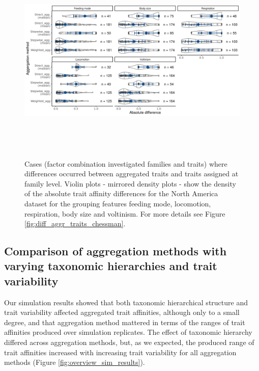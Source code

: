 \documentclass{article}
\begin{document}
\begin{figure}[H]
  \centering
  \includegraphics[width=16.5cm, height=10cm]{Deviances_trait_agg_pyne.png}
  \caption{Cases (factor combination investigated families and traits) where differences occurred between aggregated traits and traits assigned at family level. Violin plots - mirrored density plots - show the density of the absolute trait affinity differences for the North America dataset for the grouping features feeding mode, locomotion, respiration, body size and voltinism. For more details see Figure \ref{fig:diff_aggr_traits_chessman}.}
  \label{fig:diff_aggr_traits_pyne}
\end{figure}

\newpage 


\subsection*{Comparison of aggregation methods with varying taxonomic hierarchies and trait variability}

Our simulation results showed that both taxonomic hierarchical structure and trait variability affected aggregated trait affinities, although only to a small degree, and that aggregation method mattered in terms of the ranges of trait affinities produced over simulation replicates. The effect of taxonomic hierarchy differed across aggregation methods, but, as we expected, the produced range of trait affinities increased with increasing trait variability for all aggregation methods (Figure \ref{fig:overview_sim_results}). %
\end{document}
